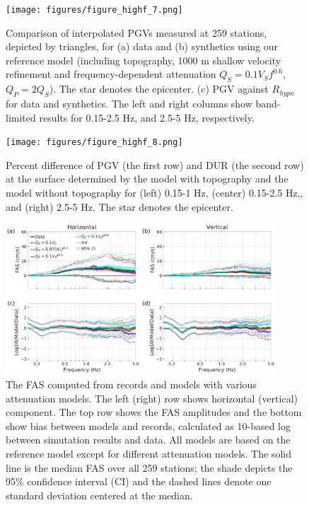 
\begin{figure}[!ht]
  \centering
  \texttt{[image: figures/figure\_highf\_7.png]}
  \caption{Comparison of interpolated PGVs measured at 259 stations, depicted by triangles, for (a) data and (b) synthetics using our reference model (including topography, 1000 m shallow velocity refinement and frequency-dependent attenuation $Q_S=0.1V_Sf^{0.6}$, $Q_P=2Q_S$). The star denotes the epicenter. (c) PGV against $R_{hypo}$ for data and synthetics. The left and right columns show band-limited results for 0.15-2.5 Hz, and 2.5-5 Hz, respectively.
  }
  \label{fig:highf-7}
\end{figure}
\clearpage

\begin{figure}[!ht]
  \centering
  \texttt{[image: figures/figure\_highf\_8.png]}
  \caption{Percent difference of PGV (the first row) and DUR (the second row) at the surface determined by the model with topography and the model without topography for (left) 0.15-1 Hz, (center) 0.15-2.5 Hz,, and (right) 2.5-5 Hz. The star denotes the epicenter.
  }
  \label{fig:highf-8}
\end{figure}
\clearpage

\begin{figure}[!ht]
  \centering
  \includegraphics[width=0.9\textwidth,height=0.9\textheight,keepaspectratio]{figures/figure_highf_9.pdf}
  \caption{The FAS computed from records and models with various attenuation models. The left (right) row shows horizontal (vertical) component. The top row shows the FAS amplitudes and the bottom show bias between models and records, calculated as 10-based log between simutation results and data. All models are based on the reference model except for different attenuation models. The solid line is the median FAS over all 259 stations; the shade depicts the 95\% confidence interval (CI) and the dashed lines denote one standard deviation centered at the median.
  }
  \label{fig:highf-9}
\end{figure}
\clearpage

